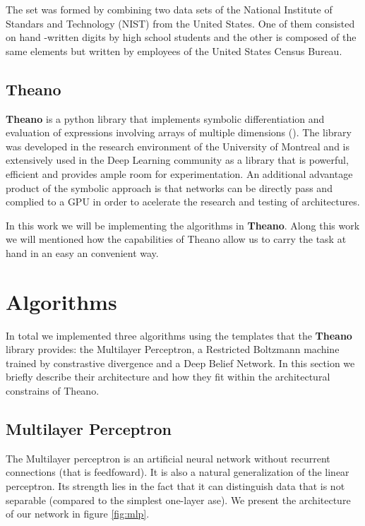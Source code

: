 \documentclass[11pt,a4paper]{article}
\begin{document}
The set was formed by combining two data sets of the National Institute of Standars and Technology (NIST) from the United States. One of them consisted on hand 
-written digits by high school students and the other is composed of the same elements but written by employees of the United States Census Bureau. 

\subsection{Theano}
\textbf{Theano} is a python library that implements symbolic differentiation and evaluation of expressions involving arrays of multiple dimensions (\cite{bergstra2010theano}). The library was developed in the research environment of the University of Montreal and is extensively used in the Deep Learning community as a library that is powerful, efficient and provides ample room for experimentation. An additional advantage product of the symbolic approach is that networks can be directly pass and complied to a GPU in order to acelerate the research and testing of architectures. 

In this work we will be implementing the algorithms in \textbf{Theano}. Along this work we will mentioned how the capabilities of Theano allow us to carry the task at hand in an easy an convenient way. 

\section{Algorithms}

In total we implemented three algorithms using the templates that the \textbf{Theano} library provides: the Multilayer Perceptron, a Restricted Boltzmann machine trained by constrastive divergence and a Deep Belief Network. In this section we briefly describe their architecture and how they fit within the architectural constrains of Theano.

\subsection{Multilayer Perceptron}

The Multilayer perceptron is an artificial neural network without recurrent connections (that is feedfoward). It is also  a natural generalization of the linear perceptron. Its strength lies in the fact that it can distinguish data that is not separable (compared to the simplest one-layer ase). We present the architecture of our network in figure \ref{fig:mlp}. 
\end{document}
